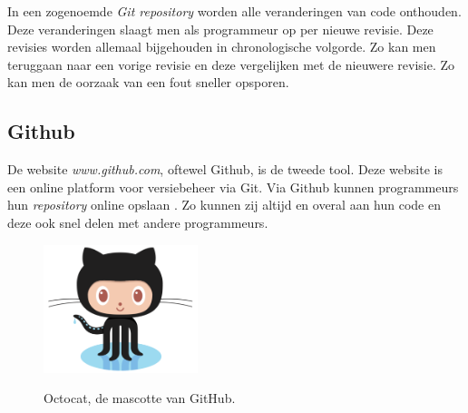 In een zogenoemde \textit{Git repository} worden alle veranderingen van code onthouden. Deze veranderingen slaagt men als programmeur op per nieuwe revisie. Deze revisies worden allemaal bijgehouden in chronologische volgorde. Zo kan men teruggaan naar een vorige revisie en deze vergelijken met de nieuwere revisie. Zo kan men de oorzaak van een fout sneller opsporen.

\subsection{Github}

De website \textit{www.github.com}, oftewel Github, is de tweede tool.
Deze website is een online platform voor versiebeheer via Git. Via Github kunnen programmeurs hun \textit{repository} online opslaan \cite{git:hello_world}. Zo kunnen zij altijd en overal aan hun code en deze ook snel delen met andere programmeurs.

\begin{figure}[ht]
    \centering
    \includegraphics[width=0.4\textwidth]{illustraties/Octocat}
    \caption{Octocat, de mascotte van GitHub.}
    \cite{git:github}
    \label{fig:octocat}
\end{figure}

